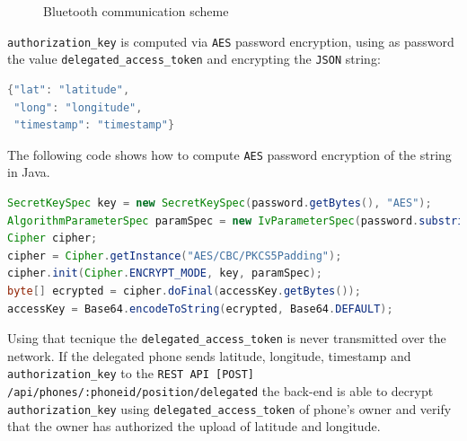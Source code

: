\documentclass[conference]{IEEEtran}
\begin{document}
\begin{figure}[!ht]
\begin{center}
\caption{Bluetooth communication scheme}
\label{img:bluetooth}
\end{center}
\end{figure}

\texttt{authorization\_key} is computed via \texttt{AES} password encryption, using as password the value \texttt{delegated\_access\_token} and encrypting the \texttt{JSON} string:
\begin{lstlisting}[language=Java, caption=JSON encrypted with AES]
{"lat": "latitude",
 "long": "longitude",
 "timestamp": "timestamp"}
\end{lstlisting}

The following code shows how to compute \texttt{AES} password encryption of the string in Java.

\begin{lstlisting}[language=Java, caption=AES password encryption]
SecretKeySpec key = new SecretKeySpec(password.getBytes(), "AES");
AlgorithmParameterSpec paramSpec = new IvParameterSpec(password.substring(0, 16).getBytes());
Cipher cipher;
cipher = Cipher.getInstance("AES/CBC/PKCS5Padding");	    
cipher.init(Cipher.ENCRYPT_MODE, key, paramSpec);			    	
byte[] ecrypted = cipher.doFinal(accessKey.getBytes());
accessKey = Base64.encodeToString(ecrypted, Base64.DEFAULT);
\end{lstlisting}

Using that tecnique the \texttt{delegated\_access\_token} is never transmitted over the network. If the delegated phone sends latitude, longitude, timestamp and \texttt{authorization\_key} to the \texttt{REST API [POST] /api/phones/:phoneid/position/delegated} the back-end is able to decrypt \texttt{authorization\_key} using \texttt{delegated\_access\_token} of phone's owner and verify that the owner has authorized the upload of latitude and longitude.
\end{document}
